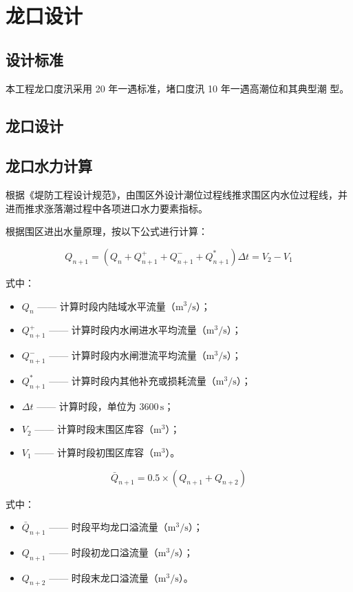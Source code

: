 \documentclass[UTF8, a4paper, 12pt]{ctexart} %
\begin{document}
\section{龙口设计}
\subsection{设计标准}
本工程龙口度汛采用 20 年一遇标准，堵口度汛 10 年一遇高潮位和其典型潮
型。
\subsection{龙口设计}



\subsection{龙口水力计算}
根据《堤防工程设计规范》，由围区外设计潮位过程线推求围区内水位过程线，并进而推求涨落潮过程中各项进口水力要素指标。

根据围区进出水量原理，按以下公式进行计算：

\begin{equation}
Q_{n+1} = (Q_n + Q_{n+1}^+ + Q_{n+1}^- + Q_{n+1}^*) \Delta t = V_2 - V_1 
\end{equation}


式中：
\begin{itemize}
    \item $Q_n$ —— 计算时段内陆域水平流量（$\text{m}^3/\text{s}$）；
    \item $Q_{n+1}^+$ —— 计算时段内水闸进水平均流量（$\text{m}^3/\text{s}$）；
    \item $Q_{n+1}^-$ —— 计算时段内水闸泄流平均流量（$\text{m}^3/\text{s}$）；
    \item $Q_{n+1}^*$ —— 计算时段内其他补充或损耗流量（$\text{m}^3/\text{s}$）；
    \item $\Delta t$ —— 计算时段，单位为 $3600\,\text{s}$；
    \item $V_2$ —— 计算时段末围区库容（$\text{m}^3$）；
    \item $V_1$ —— 计算时段初围区库容（$\text{m}^3$）。
\end{itemize}

\begin{equation}
    \bar{Q}_{n+1} = 0.5 \times (Q_{n+1} + Q_{n+2}) 
\end{equation}


式中：
\begin{itemize}
    \item $\bar{Q}_{n+1}$ —— 时段平均龙口溢流量（$\text{m}^3/\text{s}$）；
    \item $Q_{n+1}$ —— 时段初龙口溢流量（$\text{m}^3/\text{s}$）；
    \item $Q_{n+2}$ —— 时段末龙口溢流量（$\text{m}^3/\text{s}$）。
\end{itemize}
\end{document}
